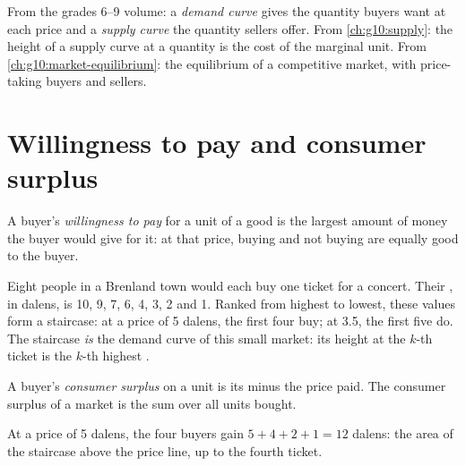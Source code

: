 \begin{recall}
From the grades 6--9 volume: a \emph{demand curve} gives the quantity buyers want at each price and a \emph{supply curve} the quantity
sellers offer. From \cref{ch:g10:supply}: the height of a supply curve at a quantity is the cost of the marginal unit. From
\cref{ch:g10:market-equilibrium}: the equilibrium of a competitive market, with price-taking buyers and sellers.
\end{recall}

\section{Willingness to pay and consumer surplus}\label{sec:g10:surplus-and-efficiency:consumer}

\begin{definition}\label{def:g10:surplus-and-efficiency:wtp}
A buyer's \emph{willingness to pay} for a unit of a good is the largest amount of money the buyer would give for
it: at that price, buying and not buying are equally good to the buyer.
\end{definition}

Eight people in a Brenland town would each buy one ticket for a concert. Their , in dalens, is 10, 9, 7, 6, 4, 3, 2 and 1.
Ranked from highest to lowest, these values form a staircase: at a price of 5 dalens, the first four buy; at 3.5, the first five do. The
staircase \emph{is} the demand curve of this small market: its height at the $k$-th ticket is the $k$-th highest .

\begin{definition}\label{def:g10:surplus-and-efficiency:consumer-surplus}
A buyer's \emph{consumer surplus} on a unit is its  minus the price paid. The consumer surplus of a
market is the sum over all units bought.
\end{definition}

At a price of 5 dalens, the four buyers gain $5 + 4 + 2 + 1 = 12$ dalens: the area of the staircase above the price line, up to the fourth
ticket.

